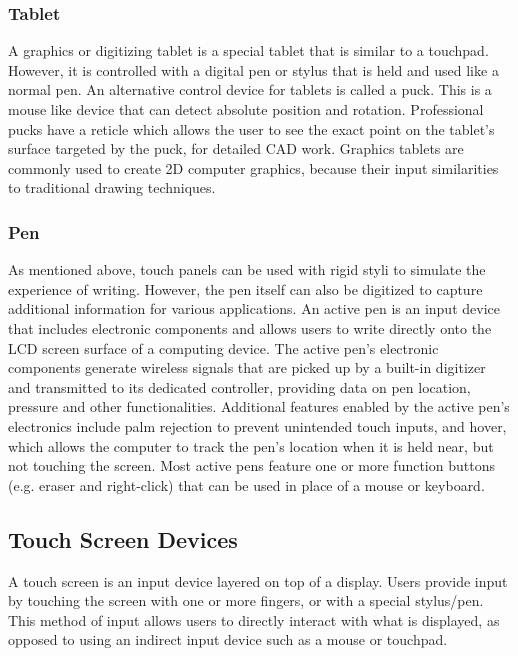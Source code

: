 \documentclass[11pt]{report}
\begin{document}
 \subsubsection{Tablet}
 A graphics or digitizing tablet is a special tablet that is similar to a touchpad. 
 However, it is controlled with a digital pen or stylus that is held and used like a normal pen.
 An alternative control device for tablets is called a puck. 
 This is a mouse like device that can detect absolute position and rotation.
 Professional pucks have a reticle which allows the user to see the exact point on the tablet's surface targeted by the puck, for detailed CAD work.
 Graphics tablets are commonly used to create 2D computer graphics, because their input similarities to traditional drawing techniques. 
 
 \subsubsection{Pen}
 
 As mentioned above, touch panels can be used with rigid styli to simulate the experience of writing. 
 However, the pen itself can also be digitized to capture additional information for various applications. 
 An active pen is an input device that includes electronic components and allows users to write directly onto the LCD screen surface of a computing device.
 The active pen's electronic components generate wireless signals that are picked up by a built-in digitizer and transmitted to its dedicated controller, providing data on pen location, pressure and other functionalities. 
 Additional features enabled by the active pen's electronics include palm rejection to prevent unintended touch inputs, and hover, which allows the computer to track the pen's location when it is held near, but not touching the screen. 
 Most active pens feature one or more function buttons (e.g. eraser and right-click) that can be used in place of a mouse or keyboard.

\subsection{Touch Screen Devices}

A touch screen is an input device layered on top of a display. 
Users provide input by touching the screen with one or more fingers, or with a special stylus/pen.
This method of input allows users to directly interact with what is displayed, as opposed to using an indirect input device such as a mouse or touchpad.
\end{document}
